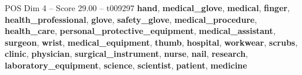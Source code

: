 \begin{textsample}{POS Dim 4 – Score 29.00 – t009297}  \label{ex:f4_pos_022}
\textbf{hand}, \textbf{medical\_glove}, \textbf{medical}, \textbf{finger}, \textbf{health\_professional}, \textbf{glove}, \textbf{safety\_glove}, \textbf{medical\_procedure}, \textbf{health\_care}, \textbf{personal\_protective\_equipment}, \textbf{medical\_assistant}, \textbf{surgeon}, \textbf{wrist}, \textbf{medical\_equipment}, \textbf{thumb}, \textbf{hospital}, \textbf{workwear}, \textbf{scrubs}, \textbf{clinic}, \textbf{physician}, \textbf{surgical\_instrument}, \textbf{nurse}, \textbf{nail}, \textbf{research}, \textbf{laboratory\_equipment}, \textbf{science}, \textbf{scientist}, \textbf{patient}, \textbf{medicine}

\end{textsample}
